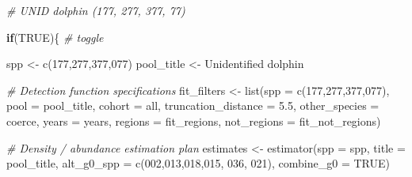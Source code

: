 \documentclass[
]{book}
\newenvironment{Shaded}{\begin{snugshade}}{\end{snugshade}}
\newcommand{\AttributeTok}[1]{\textcolor[rgb]{0.77,0.63,0.00}{#1}}
\newcommand{\CommentTok}[1]{\textcolor[rgb]{0.56,0.35,0.01}{\textit{#1}}}
\newcommand{\ConstantTok}[1]{\textcolor[rgb]{0.00,0.00,0.00}{#1}}
\newcommand{\ControlFlowTok}[1]{\textcolor[rgb]{0.13,0.29,0.53}{\textbf{#1}}}
\newcommand{\FloatTok}[1]{\textcolor[rgb]{0.00,0.00,0.81}{#1}}
\newcommand{\FunctionTok}[1]{\textcolor[rgb]{0.00,0.00,0.00}{#1}}
\newcommand{\NormalTok}[1]{#1}
\newcommand{\OtherTok}[1]{\textcolor[rgb]{0.56,0.35,0.01}{#1}}
\newcommand{\StringTok}[1]{\textcolor[rgb]{0.31,0.60,0.02}{#1}}
\begin{document}
\begin{Shaded}
\begin{Highlighting}[]
\CommentTok{\# UNID dolphin (177, 277, 377, 77)}

\ControlFlowTok{if}\NormalTok{(}\ConstantTok{TRUE}\NormalTok{)\{ }\CommentTok{\# toggle}

\NormalTok{  spp }\OtherTok{\textless{}{-}} \FunctionTok{c}\NormalTok{(}\StringTok{\textquotesingle{}177\textquotesingle{}}\NormalTok{,}\StringTok{\textquotesingle{}277\textquotesingle{}}\NormalTok{,}\StringTok{\textquotesingle{}377\textquotesingle{}}\NormalTok{,}\StringTok{\textquotesingle{}077\textquotesingle{}}\NormalTok{)}
\NormalTok{  pool\_title }\OtherTok{\textless{}{-}} \StringTok{\textquotesingle{}Unidentified dolphin\textquotesingle{}}

  \CommentTok{\# Detection function specifications}
\NormalTok{  fit\_filters }\OtherTok{\textless{}{-}}
    \FunctionTok{list}\NormalTok{(}\AttributeTok{spp =} \FunctionTok{c}\NormalTok{(}\StringTok{\textquotesingle{}177\textquotesingle{}}\NormalTok{,}\StringTok{\textquotesingle{}277\textquotesingle{}}\NormalTok{,}\StringTok{\textquotesingle{}377\textquotesingle{}}\NormalTok{,}\StringTok{\textquotesingle{}077\textquotesingle{}}\NormalTok{),}
         \AttributeTok{pool =}\NormalTok{ pool\_title,}
         \AttributeTok{cohort =} \StringTok{\textquotesingle{}all\textquotesingle{}}\NormalTok{,}
         \AttributeTok{truncation\_distance =} \FloatTok{5.5}\NormalTok{,}
         \AttributeTok{other\_species =} \StringTok{\textquotesingle{}coerce\textquotesingle{}}\NormalTok{,}
         \AttributeTok{years =}\NormalTok{ years,}
         \AttributeTok{regions =}\NormalTok{ fit\_regions,}
         \AttributeTok{not\_regions =}\NormalTok{ fit\_not\_regions)}

  \CommentTok{\# Density / abundance estimation plan}
\NormalTok{  estimates }\OtherTok{\textless{}{-}} \FunctionTok{estimator}\NormalTok{(}\AttributeTok{spp =}\NormalTok{ spp, }
                         \AttributeTok{title =}\NormalTok{ pool\_title,}
                         \AttributeTok{alt\_g0\_spp =} \FunctionTok{c}\NormalTok{(}\StringTok{\textquotesingle{}002\textquotesingle{}}\NormalTok{,}\StringTok{\textquotesingle{}013\textquotesingle{}}\NormalTok{,}\StringTok{\textquotesingle{}018\textquotesingle{}}\NormalTok{,}\StringTok{\textquotesingle{}015\textquotesingle{}}\NormalTok{, }\StringTok{\textquotesingle{}036\textquotesingle{}}\NormalTok{, }\StringTok{\textquotesingle{}021\textquotesingle{}}\NormalTok{),}
                         \AttributeTok{combine\_g0 =} \ConstantTok{TRUE}\NormalTok{)}
  

\end{Highlighting}
\end{Shaded}
\end{document}
